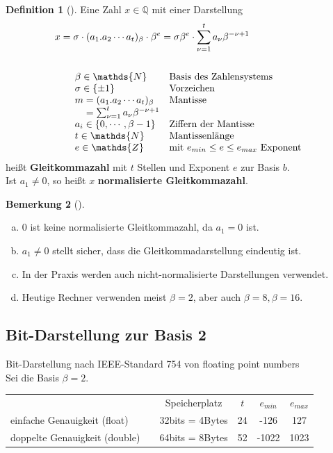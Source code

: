 \documentclass[ngerman,fontsize=11pt, paper=a4, parskip=half, titlepage=true, toc=bib]{scrbook}
\theoremstyle{definition}
\newtheorem{Def}{Definition}[section]		%
\newtheorem{Bem}[Def]{Bemerkung}	%
\theoremstyle{plain}
\newcommand{\Q}{\mathds{Q}}
\newcommand{\N}{\mathds{N}}
\newcommand{\Z}{\mathds{Z}}
\newcommand{\subsectione}[1]{\addtocounter{Def}{1}\subsection{#1}}
\newenvironment{Beme}[1][]{ %
	\begin{Bem}[#1]
	}
	{
	\end{Bem}
	\addtocounter{subsection}{1}
}
\newenvironment{Defe}[1][]{ %
	\begin{Def}[#1]
	}
	{
	\end{Def}
	\addtocounter{subsection}{1}
}
\begin{document}
\begin{Defe}
	\label{3.1.1} 
	Eine Zahl $x\in\Q$ mit einer Darstellung
	\begin{align*}
	x&=\sigma \cdot(a_1 . a_2 \cdots a_t)_{\beta}\cdot \beta^e 
	= \sigma\beta^e \cdot \sum_{\nu=1}^{t}a_\nu \beta^{-\nu+1}\\\\
	&\quad\begin{array}{ll}
	\beta\in\N & \text{Basis des Zahlensystems}\index{Basis}\\
	\sigma \in\{\pm 1\} &\text{Vorzeichen} \\
	m = (a_1 . a_2 \cdots a_t)_{\beta} &\text{Mantisse}\index{Mantisse}\\
	\phantom{m}= \sum_{\nu=1}^{t}a_\nu \beta^{-\nu+1} \\
	a_i \in\{0,\cdots , \beta-1\}&\text{Ziffern der Mantisse}\\
	t\in\N&\text{Mantissenlänge} \\
	e\in\Z &\text{mit }e_{min}\leq e \leq e_{max} \text{ Exponent}
	\end{array}
	\end{align*}
	heißt \textbf{Gleitkommazahl} mit $t$ Stellen und Exponent $e$ zur Basis $b$. \\
	Ist $a_1\neq 0$, so heißt $x$ \textbf{normalisierte Gleitkommazahl}.
\end{Defe}

\begin{Beme}
	\label{3.1.2}~
	\begin{enumerate}[a)]
		\item 0 ist keine normalisierte Gleitkommazahl, da $a_1 =  0$ ist.
		\item $a_1\neq 0$ stellt sicher, dass die Gleitkommadarstellung eindeutig ist.
		\item In der Praxis werden auch nicht-normalisierte Darstellungen verwendet.
		\item Heutige Rechner verwenden meist $\beta =2$, aber auch $\beta=8, \beta=16$.
	\end{enumerate}
\end{Beme}

\subsectione{Bit-Darstellung zur Basis 2}
 \label{3.1.3}
Bit-Darstellung nach IEEE-Standard 754 von floating point numbers \\
Sei die Basis $\beta=2$.

\begin{tabular}{l@{}cccc@{}}
  & Speicherplatz & $t$ & $e_{min}$ & $e_{max}$ \\
  \cmidrule{2-5}
  einfache Genauigkeit (float) \index{floating point} & 32bits = 4Bytes & 24 &-126 & 127 \\
  doppelte  Genauigkeit (double)~~\index{double} & 64bits = 8Bytes& 52 & -1022 & 1023
\end{tabular}\\
\end{document}
